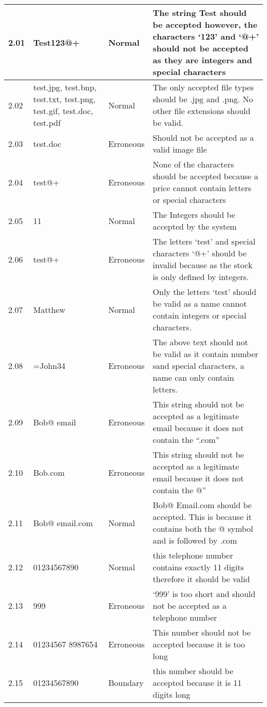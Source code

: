 \begin{flushleft}
\begin{longtable}{|p{1.5cm}|p{2.5cm}|p{2cm}|p{4.5cm}|}
	2.01 & Test123@+ & Normal & The string Test should be accepted however, the characters `123' and `@+' should not be accepted as they are integers and special characters  \\ \hline
	2.02 &  test.jpg, test.bnp, test.txt, test.png, test.gif, test.doc, test.pdf & Normal & The only accepted file types should be .jpg and .png. No other file extensions should be valid.  \\ \hline
	2.03 &  test.doc & Erroneous &  Should not be accepted as a valid image file  \\ \hline
	2.04 &  test@+ & Erroneous  &  None of the characters should be accepted because a price cannot contain letters or special characters  \\ \hline
	2.05 &  11  & Normal & The Integers should be accepted by the system \\ \hline
	2.06 &  test@+ & Erroneous & The letters `test' and special characters `@+' should be invalid because as the stock is only defined by integers. \\ \hline
	2.07 &  Matthew & Normal & Only the letters `test' should be valid as a name cannot contain integers or special characters. \\ \hline
	2.08 &  =John34 & Erroneous & The above text should not be valid as it contain number sand special characters, a name can only contain letters. \\ \hline
	2.09 &   Bob@ email  & Erroneous & This string should not be accepted as a legitimate email because it does not contain the ``.com'' \\ \hline
	2.10 &  Bob.com& Erroneous &  This string should not be accepted as a legitimate email because it does not contain the @'' \\ \hline
	2.11 &  Bob@ email.com & Normal &  Bob@ Email.com should be accepted. This is because it contains both the @ symbol and is followed by .com \\ \hline
	2.12 &  01234567890 & Normal & this telephone number contains exactly 11 digits therefore it should be valid \\ \hline
	2.13 &  999& Erroneous &  `999' is too short and should not be accepted as a telephone number \\ \hline
	2.14 &  01234567 8987654 & Erroneous & This number should not be accepted because it is too long \\ \hline
	2.15 &  01234567890 & Boundary & this number should be accepted because it is 11 digits long \\ \hline

\end{longtable}
\end{flushleft}
